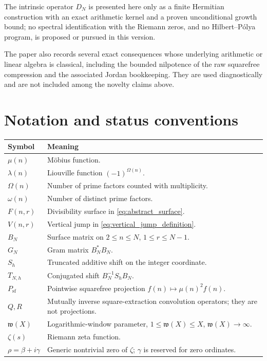 \documentclass[11pt]{amsart}
\numberwithin{equation}{section}
\theoremstyle{plain}
\theoremstyle{definition}
\theoremstyle{remark}
\newcommand{\mob}{\mu}
\newcommand{\liou}{\lambda}
\newcommand{\Fsurf}{F}
\newcommand{\Vjump}{V}
\newcommand{\what}{\mathfrak w}
\begin{document}
The intrinsic operator $D_N$ is presented here only as a finite Hermitian construction with an exact arithmetic kernel and a proven unconditional growth bound; no spectral identification with the Riemann zeros, and no Hilbert--Pólya program, is proposed or pursued in this version.

The paper also records several exact consequences whose underlying arithmetic or linear algebra is classical, including the bounded nilpotence of the raw squarefree compression and the associated Jordan bookkeeping.  They are used diagnostically and are not included among the novelty claims above.

\section{Notation and status conventions}
\label{sec:notation}

\begin{center}
\begin{tabular}{>{\raggedright\arraybackslash}p{} >{\raggedright\arraybackslash}p{}}
\toprule
Symbol & Meaning\\
\midrule
$\mob(n)$ & Möbius function.\\
$\liou(n)$ & Liouville function $(-1)^{\Omega(n)}$.\\
$\Omega(n)$ & Number of prime factors counted with multiplicity.\\
$\omega(n)$ & Number of distinct prime factors.\\
$\Fsurf(n,r)$ & Divisibility surface in \eqref{eq:abstract_surface}.\\
$\Vjump(n,r)$ & Vertical jump in \eqref{eq:vertical_jump_definition}.\\
$B_N$ & Surface matrix on $2\le n\le N$, $1\le r\le N-1$.\\
$G_N$ & Gram matrix $B_N^*B_N$.\\
$S_h$ & Truncated additive shift on the integer coordinate.\\
$T_{N,h}$ & Conjugated shift $B_N^{-1}S_hB_N$.\\
$P_{\mathrm{sf}}$ & Pointwise squarefree projection $f(n)\mapsto\mob(n)^2f(n)$.\\
$Q,R$ & Mutually inverse square-extraction convolution operators; they are not projections.\\
$\what(X)$ & Logarithmic-window parameter, $1\le\what(X)\le X$, $\what(X)\to\infty$.\\
$\zeta(s)$ & Riemann zeta function.\\
$\rho=\beta+i\gamma$ & Generic nontrivial zero of $\zeta$; $\gamma$ is reserved for zero ordinates.\\
\bottomrule
\end{tabular}
\end{center}
\end{document}
